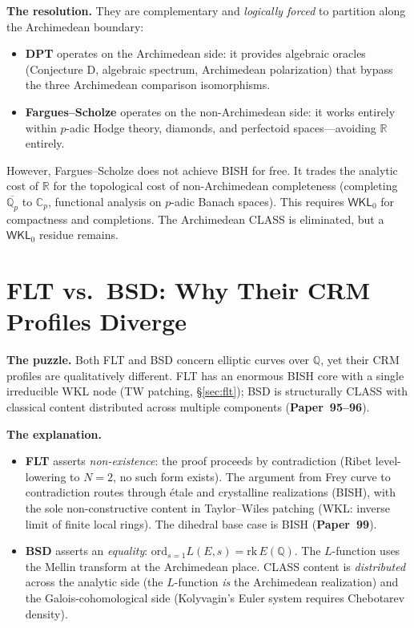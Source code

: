 \documentclass[11pt,twoside,openany]{report}
\theoremstyle{remark}
\newcommand{\BISH}{\textsf{BISH}}
\newcommand{\WKL}{\textsf{WKL}}
\newcommand{\CLASS}{\textsf{CLASS}}
\newcommand{\paperref}[1]{\textbf{Paper~#1}}
\begin{document}
\textbf{The resolution.} They are complementary and \emph{logically forced} to partition along the Archimedean boundary:
\begin{itemize}
  \item \textbf{DPT} operates on the Archimedean side: it provides algebraic oracles (Conjecture D, algebraic spectrum, Archimedean polarization) that bypass the three Archimedean comparison isomorphisms.
  \item \textbf{Fargues--Scholze} operates on the non-Archimedean side: it works entirely within $p$-adic Hodge theory, diamonds, and perfectoid spaces---avoiding $\mathbb{R}$ entirely.
\end{itemize}

However, Fargues--Scholze does not achieve \BISH{} for free. It trades the analytic cost of $\mathbb{R}$ for the topological cost of non-Archimedean completeness (completing $\overline{\mathbb{Q}_p}$ to $\mathbb{C}_p$, functional analysis on $p$-adic Banach spaces). This requires $\textsf{WKL}_0$ for compactness and completions. The Archimedean \CLASS{} is eliminated, but a $\textsf{WKL}_0$ residue remains.


\section{FLT vs.\ BSD: Why Their CRM Profiles Diverge}

\textbf{The puzzle.} Both FLT and BSD concern elliptic curves over $\mathbb{Q}$, yet their CRM profiles are qualitatively different. FLT has an enormous \BISH{} core with a single irreducible \WKL{} node (TW patching, \S\ref{sec:flt}); BSD is structurally \CLASS{} with classical content distributed across multiple components (\paperref{95--96}).

\textbf{The explanation.}
\begin{itemize}
  \item \textbf{FLT} asserts \emph{non-existence}: the proof proceeds by contradiction (Ribet level-lowering to $N = 2$, no such form exists). The argument from Frey curve to contradiction routes through \'etale and crystalline realizations (\BISH), with the sole non-constructive content in Taylor--Wiles patching (\WKL: inverse limit of finite local rings). The dihedral base case is \BISH{} (\paperref{99}).
  \item \textbf{BSD} asserts an \emph{equality}: $\mathrm{ord}_{s=1} L(E,s) = \mathrm{rk}\, E(\mathbb{Q})$. The $L$-function uses the Mellin transform at the Archimedean place. \CLASS{} content is \emph{distributed} across the analytic side (the $L$-function \emph{is} the Archimedean realization) and the Galois-cohomological side (Kolyvagin's Euler system requires Chebotarev density).
\end{itemize}
\end{document}
